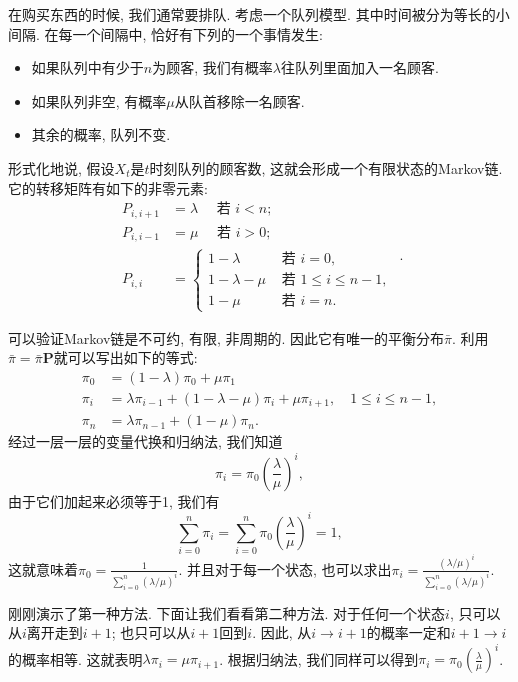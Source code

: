 \begin{example}
    在购买东西的时候, 我们通常要排队. 考虑一个队列模型. 其中时间被分为等长的小间隔. 在每一个间隔中, 恰好有下列的一个事情发生: 
    \begin{itemize}
        \item 如果队列中有少于$n$为顾客, 我们有概率$\lambda$往队列里面加入一名顾客. 
        \item 如果队列非空, 有概率$\mu$从队首移除一名顾客. 
        \item 其余的概率, 队列不变. 
    \end{itemize}

    形式化地说, 假设$X_t$是$t$时刻队列的顾客数, 这就会形成一个有限状态的Markov链. 它的转移矩阵有如下的非零元素: 
    $$\begin{aligned} P_{i, i+1} & =\lambda \quad \text { 若 } i<n ; \\ P_{i, i-1} & =\mu \quad \text { 若 } i>0 ; \\ P_{i, i} & = \begin{cases}1-\lambda & \text { 若 } i=0, \\ 1-\lambda-\mu & \text { 若 } 1 \leq i \leq n-1, \\ 1-\mu & \text { 若 } i=n .\end{cases} \end{aligned}.$$

    可以验证Markov链是不可约, 有限, 非周期的. 因此它有唯一的平衡分布$\bar\pi$. 利用$\bar{\pi}=\bar{\pi} \mathbf{P}$就可以写出如下的等式: 
    $$\begin{aligned} \pi_0 & =(1-\lambda) \pi_0+\mu \pi_1 \\ \pi_i & =\lambda \pi_{i-1}+(1-\lambda-\mu) \pi_i+\mu \pi_{i+1}, \quad 1 \leq i \leq n-1, \\ \pi_n & =\lambda \pi_{n-1}+(1-\mu) \pi_n .\end{aligned}$$
    经过一层一层的变量代换和归纳法, 我们知道$$\pi_i=\pi_0\left(\frac{\lambda}{\mu}\right)^i,$$ 由于它们加起来必须等于1, 我们有$$\sum_{i=0}^n \pi_i=\sum_{i=0}^n \pi_0\left(\frac{\lambda}{\mu}\right)^i=1,$$这就意味着$\pi_0=\frac{1}{\sum_{i=0}^n(\lambda / \mu)^i}$. 并且对于每一个状态, 也可以求出$\pi_i=\frac{(\lambda / \mu)^i}{\sum_{i=0}^n(\lambda / \mu)^i}$. 

    刚刚演示了第一种方法. 下面让我们看看第二种方法. 对于任何一个状态$i$, 只可以从$i$离开走到$i+1$; 也只可以从$i+1$回到$i$. 因此, 从$i\to i+1$的概率一定和$i+1\to i$的概率相等. 这就表明$\lambda \pi_i=\mu \pi_{i+1}$. 根据归纳法, 我们同样可以得到$\pi_i=\pi_0\left(\frac{\lambda}{\mu}\right)^i$.


\end{example}
